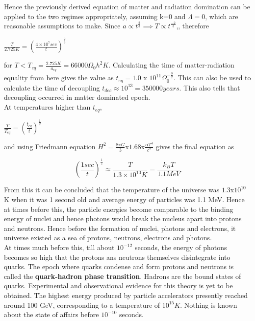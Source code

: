 \documentclass{article}
\begin{document}
Hence the previously derived equation of matter and radiation domination can be applied to the two regimes appropriately, assuming k=0 and $\Lambda = 0$, which are reasonable assumptions to make.
Since $a \propto t^{\frac{2}{3}} \implies T \propto t^{\frac{-2}{3}}$,, therefore

\begin{center}
    $\frac{T}{2.725 K} = (\frac{4 \times 10^7 sec}{t})^{\frac{2}{3}}$
\end{center}
 for $T<T_{eq} = \frac{2.725 K}{a_{eq}} = 66000 \Omega_{0}h^2K$. Calculating the time of matter-radiation equality from here gives the value as $t_{eq} = 1.0$ x $10^11\Omega_{0}^{-\frac{3}{2}}$. This can also be used to calculate the time of decoupling $t_{dec} \approx 10^13 = 350000 years$. This also tells that decoupling occurred in matter dominated epoch.
\\
At temperatures higher than ${t_{eq}}$, 

\begin{center}
    $\frac{T}{T_{eq}} = (\frac{t_{eq}}{t})^{\frac{1}{2}}$
\end{center}

and using Friedmann equation $H^2 = \frac{8{\pi}G}{3}$x$1.68$x${\frac{{\alpha}T^4}{c^2}}$ gives the final equation as

\begin{equation}
    (\frac{1 sec}{t})^{\frac{1}{2}} \approx \frac{T}{1.3 \times 10^10 K} = \frac{{k_B}T}{1.1 MeV}
\end{equation}

From this it can be concluded that the temperature of the universe was $1.3$x$10^10$ K when it was 1 second old and average energy of particles was 1.1 MeV. Hence at times before this, the particle energies become comparable to the binding energy of nuclei and hence photons would break the nucleus apart into protons and neutrons. Hence before the formation of nuclei, photons and electrons, it universe existed as a sea of protons, neutrons, electrons and photons. 
\\
At times much before this, till about $10^{-12}$ seconds, the energy of photons becomes so high that the protons ans neutrons themselves disintegrate into quarks. The epoch where quarks condense and form protons and neutrons is called the \textbf{quark-hadron phase transition}. Hadrons are the bound states of quarks. Experimental and observational evidence for this theory is yet to be obtained.
The highest energy produced by particle accelerators presently reached around 100 GeV, corresponding to a temperature of $10^15 K$. Nothing is known about the state of affairs before $10^{-10}$ seconds.
\end{document}
